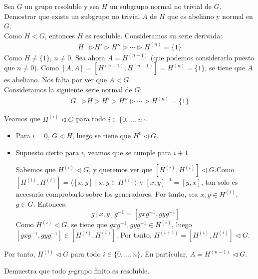 \begin{ejercicio}
    Sea $G$ un grupo resoluble y sea $H$ un subgrupo normal no trivial de $G$. Demostrar que existe un subgrupo no trivial $A$ de $H$ que es abeliano y normal en $G$.\\

    Como $H<G$, entonces $H$ es resoluble. Consideramos su serie derivada:
    \begin{align*}
        H &\rhd H' \rhd H'' \rhd \cdots \rhd H^{(n)} = \{1\}
    \end{align*}
    Como $H\neq \{1\}$, $n\neq 0$. Sea ahora $A=H^{(n-1)}$ (que podemos considerarlo puesto que $n\neq 0$). Como $[A,A]=[H^{(n-1)},H^{(n-1)}]=H^{(n)}=\{1\}$, se tiene que $A$ es abeliano. Nos falta por ver que $A\lhd G$.\\


    Consideramos la siguiente serie normal de $G$:
    \begin{align*}
        G &\rhd H\rhd H' \rhd H'' \rhd \cdots \rhd H^{(n)} = \{1\}
    \end{align*}
    
    Veamos que $H^{(i)}\lhd G$ para todo $i\in\{0,\ldots,n\}$.
    \begin{itemize}
        \item Para $i=0$, $G\lhd H$, luego se tiene que $H^0\lhd G$.
        \item Supuesto cierto para $i$, veamos que se cumple para $i+1$.
        
        Sabemos que $H^{(i)}\lhd G$, y queremos ver que $[H^{(i)},H^{(i)}]\lhd G$.Como $[H^{(i)},H^{(i)}]=\langle [x,y] \mid x,y\in H^{(i)}\rangle$ y $[x,y]^{-1}=[y,x]$, tan solo es necesario comprobarlo sobre los generadores. Por tanto, sea $x,y\in H^{(i)}$, $g\in G$. Entonces:
        \begin{equation*}
            g[x,y]g^{-1} = [gxg^{-1},gyg^{-1}]
        \end{equation*}
        Como $H^{(i)}\lhd G$, se tiene que $gxg^{-1},gyg^{-1}\in H^{(i)}$, luego $[gxg^{-1},gyg^{-1}]\in [H^{(i)},H^{(i)}]$. Por tanto, $H^{(i+1)}= [H^{(i)},H^{(i)}]\lhd G$.
    \end{itemize}

    Por tanto, $H^{(i)}\lhd G$ para todo $i\in\{0,\ldots,n\}$. En particular, $A=H^{(n-1)}\lhd G$.
\end{ejercicio}

\begin{ejercicio}
    Demuestra que todo $p$-grupo finito es resoluble.


\end{ejercicio}

